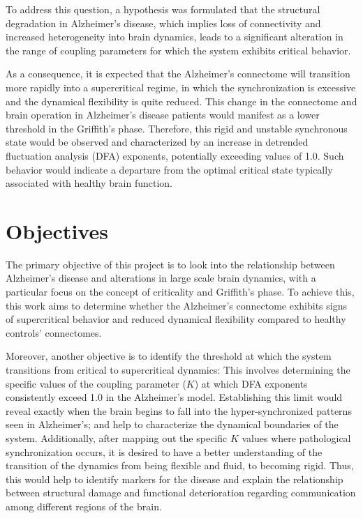 \documentclass[12pt,a4paper]{article}
\begin{document}
To address this question, a hypothesis was formulated that the structural degradation in Alzheimer's disease, which implies loss of connectivity and increased heterogeneity into brain dynamics, leads to a significant alteration in the range of coupling parameters for which the system exhibits critical behavior.

As a consequence, it is expected that the Alzheimer's connectome will transition more rapidly into a supercritical regime, in which the synchronization is excessive and the dynamical flexibility is quite reduced. This change in the connectome and brain operation in Alzheimer's disease patients would manifest as a lower threshold in the Griffith's phase. Therefore, this rigid and unstable synchronous state would be observed and characterized by an increase in detrended fluctuation analysis (DFA) exponents, potentially exceeding values of 1.0. Such behavior would indicate a departure from the optimal critical state typically associated with healthy brain function.

\section{Objectives}

The primary objective of this project is to look into the relationship between Alzheimer's disease and alterations in large scale brain dynamics, with a particular focus on the concept of criticality and Griffith's phase. To achieve this, this work aims to determine whether the Alzheimer's connectome exhibits signs of supercritical behavior and reduced dynamical flexibility compared to healthy controls' connectomes.

Moreover, another objective is to identify the threshold at which the system transitions from critical to supercritical dynamics: This involves determining the specific values of the coupling parameter ($K$) at which DFA exponents consistently exceed 1.0 in the Alzheimer's model. Establishing this limit would reveal exactly when the brain begins to fall into the hyper-synchronized patterns seen in Alzheimer's; and help to characterize the dynamical boundaries of the system. Additionally, after mapping out the specific $K$ values where pathological synchronization occurs, it is desired to have a better understanding of the transition of the dynamics from being flexible and fluid, to becoming rigid. Thus, this would help to identify markers for the disease and explain the relationship between structural damage and functional deterioration regarding communication among different regions of the brain.
\end{document}
